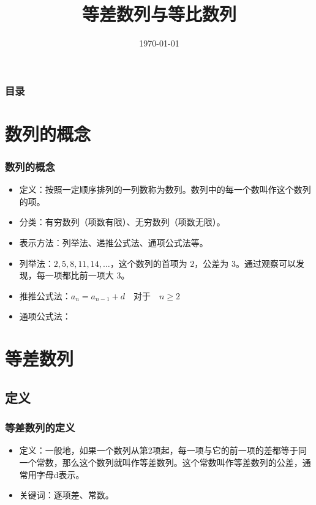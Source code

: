 \documentclass{ctexbeamer}
\title{等差数列与等比数列}
\date{\today}
\begin{document}
\begin{frame}
\titlepage
\end{frame}

\begin{frame}
\frametitle{目录}
\tableofcontents
\end{frame}

\section{数列的概念}
\begin{frame}
\frametitle{数列的概念}
\begin{itemize}
    \item 定义：按照一定顺序排列的一列数称为数列。数列中的每一个数叫作这个数列的项。
    \item 分类：有穷数列（项数有限）、无穷数列（项数无限）。
    \item 表示方法：列举法、递推公式法、通项公式法等。
    \item 列举法：$2, 5, 8, 11, 14, \ldots$，这个数列的首项为 \(2\)，公差为 \(3\)。通过观察可以发现，每一项都比前一项大 \(3\)。
    \item 推推公式法：$a_n = a_{n-1} + d \quad \text{对于} \quad n \geq 2$
    \item 通项公式法：
\end{itemize}
\end{frame}

\section{等差数列}
\subsection{定义}
\begin{frame}
\frametitle{等差数列的定义}
\begin{itemize}
    \item 定义：一般地，如果一个数列从第2项起，每一项与它的前一项的差都等于同一个常数，那么这个数列就叫作等差数列。这个常数叫作等差数列的公差，通常用字母d表示。
    \item 关键词：逐项差、常数。
\end{itemize}
\end{frame}
\end{document}
